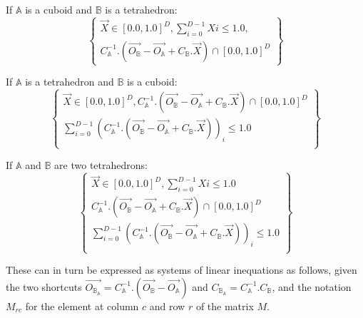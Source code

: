 \documentclass[12pt, a4paper]{article}
\begin{document}
If $\mathbb{A}$ is a cuboid and $\mathbb{B}$ is a tetrahedron:
\begin{equation}
\left\lbrace
\begin{array}{c}
\overrightarrow{X}\in[0.0,1.0]^D,\sum_{i=0}^{D-1}Xi\le1.0,\\
C_\mathbb{A}^{-1}.\left(\overrightarrow{O_\mathbb{B}}-\overrightarrow{O_\mathbb{A}}+C_\mathbb{B}.\overrightarrow{X}\right)\cap[0.0,1.0]^D
\end{array}
\right\rbrace
\end{equation}

If $\mathbb{A}$ is a tetrahedron and $\mathbb{B}$ is a cuboid:
\begin{equation}
\left\lbrace
\begin{array}{c}
\overrightarrow{X}\in[0.0,1.0]^D,C_\mathbb{A}^{-1}.\left(\overrightarrow{O_\mathbb{B}}-\overrightarrow{O_\mathbb{A}}+C_\mathbb{B}.\overrightarrow{X}\right)\cap[0.0,1.0]^D\\
\sum_{i=0}^{D-1}\left(C_\mathbb{A}^{-1}.\left(\overrightarrow{O_\mathbb{B}}-\overrightarrow{O_\mathbb{A}}+C_\mathbb{B}.\overrightarrow{X}\right)\right)_i\le1.0\\
\end{array}
\right\rbrace
\end{equation}

If $\mathbb{A}$ and $\mathbb{B}$ are two tetrahedrons:
\begin{equation}
\left\lbrace
\begin{array}{c}
\overrightarrow{X}\in[0.0,1.0]^D,\sum_{i=0}^{D-1}Xi\le1.0\\
C_\mathbb{A}^{-1}.(\overrightarrow{O_\mathbb{B}}-\overrightarrow{O_\mathbb{A}}+C_\mathbb{B}.\overrightarrow{X})\cap[0.0,1.0]^D\\
\sum_{i=0}^{D-1}\left(C_\mathbb{A}^{-1}.\left(\overrightarrow{O_\mathbb{B}}-\overrightarrow{O_\mathbb{A}}+C_\mathbb{B}.\overrightarrow{X}\right)\right)_i\le1.0\\
\end{array}
\right\rbrace
\end{equation}

These can in turn be expressed as systems of linear inequations as follows, given the two shortcuts $\overrightarrow{O_{\mathbb{B}_\mathbb{A}}}=C_\mathbb{A}^{-1}.(\overrightarrow{O_\mathbb{B}}-\overrightarrow{O_\mathbb{A}})$ and $C_{\mathbb{B}_\mathbb{A}}=C_\mathbb{A}^{-1}.C_{\mathbb{B}}$, and the notation $M_{rc}$ for the element at column $c$ and row $r$ of the matrix $M$.
\end{document}
